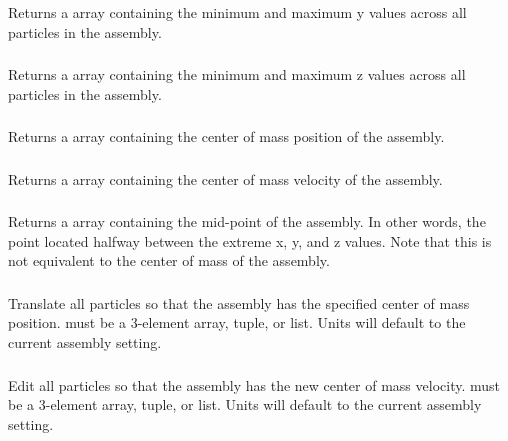 \subsubsection{}
Returns a  array containing the minimum and maximum y values across all particles in the assembly.

\subsubsection{}
Returns a  array containing the minimum and maximum z values across all particles in the assembly.

\subsubsection{}
Returns a  array containing the center of mass position of the assembly.

\subsubsection{}
Returns a  array containing the center of mass velocity of the assembly.

\subsubsection{}
Returns a  array containing the mid-point of the assembly. In other words, the point located halfway between the extreme x, y, and z values. Note that this is not equivalent to the center of mass of the assembly.

\subsubsection{}
Translate all particles so that the assembly has the specified center of mass position.  must be a 3-element  array, tuple, or list. Units will default to the current assembly setting.

\subsubsection{}
Edit all particles so that the assembly has the new center of mass velocity.  must be a 3-element  array, tuple, or list. Units will default to the current assembly setting.

